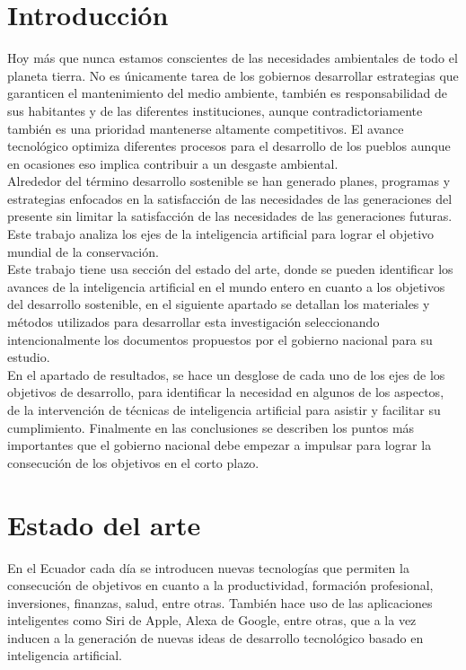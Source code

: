 \documentclass[preprint,12pt,3p]{elsarticle}
\begin{document}

\section{Introducción}
\label{sec1}
Hoy más que nunca estamos conscientes de las necesidades ambientales de todo el planeta tierra. No es únicamente tarea de los gobiernos desarrollar estrategias que garanticen el mantenimiento del medio ambiente, también es responsabilidad de sus habitantes y de las diferentes instituciones, aunque contradictoriamente también es una prioridad mantenerse altamente competitivos. El avance tecnológico optimiza diferentes procesos para el desarrollo de los pueblos aunque en ocasiones eso implica contribuir a un desgaste ambiental.\\

Alrededor del término desarrollo sostenible se han generado planes, programas y estrategias enfocados en la satisfacción de las necesidades de las generaciones del presente sin limitar la satisfacción de las necesidades de las generaciones futuras. Este trabajo analiza los ejes de la inteligencia artificial para lograr el objetivo mundial de la conservación.\\

Este trabajo tiene usa sección del estado del arte, donde se pueden identificar los avances de la inteligencia artificial en el mundo entero en cuanto a los objetivos del desarrollo sostenible, en el siguiente apartado se detallan los materiales y métodos utilizados para desarrollar esta investigación seleccionando intencionalmente los documentos propuestos por el gobierno nacional para su estudio. \\

En el apartado de resultados, se hace un desglose de cada uno de los ejes de los objetivos de desarrollo, para identificar la necesidad en algunos de los aspectos, de la intervención de técnicas de inteligencia artificial para asistir y facilitar su cumplimiento. Finalmente en las conclusiones se describen los puntos más importantes que el gobierno nacional debe empezar a impulsar para lograr la consecución de los objetivos en el corto plazo.


\section{Estado del arte}
\label{sec2}
En el Ecuador cada día se introducen nuevas tecnologías que permiten la consecución de objetivos en cuanto a la productividad, formación profesional, inversiones, finanzas, salud, entre otras. También hace uso de las aplicaciones inteligentes como Siri de Apple, Alexa de Google, entre otras, que a la vez inducen a la generación de nuevas ideas de desarrollo tecnológico basado en inteligencia artificial. \\
\end{document}
